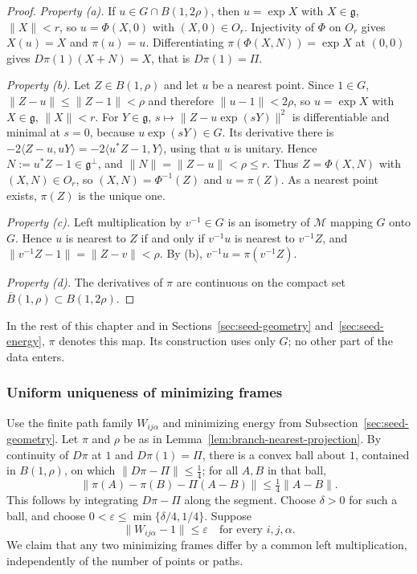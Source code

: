 \begin{proof}
\emph{Property (a).} If $u\in G\cap B(1,2\rho)$, then $u=\exp X$ with
$X\in\mathfrak g$, $\|X\|<r$, so $u=\Phi(X,0)$ with $(X,0)\in O_r$.
Injectivity of $\Phi$ on $O_r$ gives $X(u)=X$ and $\pi(u)=u$.
Differentiating $\pi(\Phi(X,N))=\exp X$ at $(0,0)$ gives
$D\pi(1)(X+N)=X$, that is $D\pi(1)=\Pi$.

\emph{Property (b).} Let $Z\in B(1,\rho)$ and let $u$ be a nearest
point. Since $1\in G$, $\|Z-u\|\le\|Z-1\|<\rho$ and therefore
$\|u-1\|<2\rho$, so $u=\exp X$ with $X\in\mathfrak g$, $\|X\|<r$.
For $Y\in\mathfrak g$, $s\mapsto\|Z-u\exp(sY)\|^2$ is differentiable
and minimal at $s=0$, because $u\exp(sY)\in G$. Its derivative there
is $-2\langle Z-u,uY\rangle=-2\langle u^*Z-1,Y\rangle$, using that $u$
is unitary. Hence $N:=u^*Z-1\in\mathfrak g^\perp$, and
$\|N\|=\|Z-u\|<\rho\le r$. Thus $Z=\Phi(X,N)$ with $(X,N)\in O_r$, so
$(X,N)=\Phi^{-1}(Z)$ and $u=\pi(Z)$. As a nearest point exists,
$\pi(Z)$ is the unique one.

\emph{Property (c).} Left multiplication by $v^{-1}\in G$ is an
isometry of $\mathcal M$ mapping $G$ onto $G$. Hence $u$ is nearest to
$Z$ if and only if $v^{-1}u$ is nearest to $v^{-1}Z$, and
$\|v^{-1}Z-1\|=\|Z-v\|<\rho$. By (b), $v^{-1}u=\pi(v^{-1}Z)$.

\emph{Property (d).} The derivatives of $\pi$ are continuous on the
compact set $\overline B(1,\rho)\subset B(1,2\rho)$.
\end{proof}

In the rest of this chapter and in Sections~\ref{sec:seed-geometry}
and~\ref{sec:seed-energy}, $\pi$ denotes this map. Its construction
uses only $G$; no other part of the data enters.

\subsubsection{Uniform uniqueness of minimizing frames}
Use the finite path family $W_{ij\alpha}$ and minimizing energy from
Subsection~\ref{sec:seed-geometry}. Let $\pi$ and $\rho$ be as in
Lemma~\ref{lem:branch-nearest-projection}. By continuity of
$D\pi$ at $1$ and $D\pi(1)=\Pi$, there is a convex ball about $1$,
contained in $B(1,\rho)$, on which $\|D\pi-\Pi\|\le\tfrac14$; for all
$A,B$ in that ball,
\begin{equation}\label{eq:branch-projection}
 \|\pi(A)-\pi(B)-\Pi(A-B)\|\le\tfrac14\|A-B\|.
\end{equation}
This follows by integrating $D\pi-\Pi$ along the segment. Choose
$\delta>0$ for such a ball, and choose
$0<\varepsilon\le\min\{\delta/4,1/4\}$. Suppose
\[
 \|W_{ij\alpha}-1\|\le\varepsilon
 \quad\text{for every }i,j,\alpha.
\]
We claim that any two minimizing frames differ by a common left
multiplication, independently of the number of points or paths.

